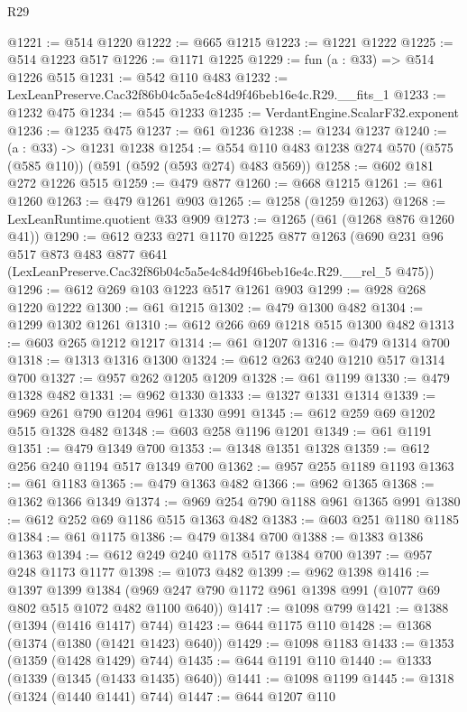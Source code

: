 \begin{lexlean}{R29}
\begin{coremodule}
@1221 := @514 @1220
@1222 := @665 @1215
@1223 := @1221 @1222
@1225 := @514 @1223 @517
@1226 := @1171 @1225
@1229 := fun (a : @33) => @514 @1226 @515
@1231 := @542 @110 @483
@1232 := LexLeanPreserve.Cac32f86b04c5a5e4c84d9f46beb16e4c.R29.__fits_1
@1233 := @1232 @475
@1234 := @545 @1233
@1235 := VerdantEngine.ScalarF32.exponent
@1236 := @1235 @475
@1237 := @61 @1236
@1238 := @1234 @1237
@1240 := (a : @33) -> @1231 @1238
@1254 := @554 @110 @483 @1238 @274 @570 (@575 (@585 @110)) (@591 (@592 (@593 @274) @483 @569))
@1258 := @602 @181 @272 @1226 @515
@1259 := @479 @877
@1260 := @668 @1215
@1261 := @61 @1260
@1263 := @479 @1261 @903
@1265 := @1258 (@1259 @1263)
@1268 := LexLeanRuntime.quotient @33 @909
@1273 := @1265 (@61 (@1268 @876 @1260 @41))
@1290 := @612
    @233
    @271
    @1170
    @1225
    @877
    @1263
    (@690
      @231
      @96
      @517
      @873
      @483
      @877
      @641
      (LexLeanPreserve.Cac32f86b04c5a5e4c84d9f46beb16e4c.R29.__rel_5 @475))
@1296 := @612 @269 @103 @1223 @517 @1261 @903
@1299 := @928 @268 @1220 @1222
@1300 := @61 @1215
@1302 := @479 @1300 @482
@1304 := @1299 @1302 @1261
@1310 := @612 @266 @69 @1218 @515 @1300 @482
@1313 := @603 @265 @1212 @1217
@1314 := @61 @1207
@1316 := @479 @1314 @700
@1318 := @1313 @1316 @1300
@1324 := @612 @263 @240 @1210 @517 @1314 @700
@1327 := @957 @262 @1205 @1209
@1328 := @61 @1199
@1330 := @479 @1328 @482
@1331 := @962 @1330
@1333 := @1327 @1331 @1314
@1339 := @969 @261 @790 @1204 @961 @1330 @991
@1345 := @612 @259 @69 @1202 @515 @1328 @482
@1348 := @603 @258 @1196 @1201
@1349 := @61 @1191
@1351 := @479 @1349 @700
@1353 := @1348 @1351 @1328
@1359 := @612 @256 @240 @1194 @517 @1349 @700
@1362 := @957 @255 @1189 @1193
@1363 := @61 @1183
@1365 := @479 @1363 @482
@1366 := @962 @1365
@1368 := @1362 @1366 @1349
@1374 := @969 @254 @790 @1188 @961 @1365 @991
@1380 := @612 @252 @69 @1186 @515 @1363 @482
@1383 := @603 @251 @1180 @1185
@1384 := @61 @1175
@1386 := @479 @1384 @700
@1388 := @1383 @1386 @1363
@1394 := @612 @249 @240 @1178 @517 @1384 @700
@1397 := @957 @248 @1173 @1177
@1398 := @1073 @482
@1399 := @962 @1398
@1416 := @1397
    @1399
    @1384
    (@969 @247 @790 @1172 @961 @1398 @991 (@1077 @69 @802 @515 @1072 @482 @1100 @640))
@1417 := @1098 @799
@1421 := @1388 (@1394 (@1416 @1417) @744)
@1423 := @644 @1175 @110
@1428 := @1368 (@1374 (@1380 (@1421 @1423) @640))
@1429 := @1098 @1183
@1433 := @1353 (@1359 (@1428 @1429) @744)
@1435 := @644 @1191 @110
@1440 := @1333 (@1339 (@1345 (@1433 @1435) @640))
@1441 := @1098 @1199
@1445 := @1318 (@1324 (@1440 @1441) @744)
@1447 := @644 @1207 @110

\end{coremodule}
\end{lexlean}
